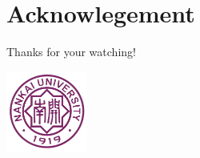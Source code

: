 \documentclass{beamer}
\begin{document}
\section{Acknowlegement}
    \begin{frame} 
        
        
    \end{frame}

    \begin{frame}
        \huge{\centerline{Thanks for your watching!}}
        \vfill
        \centering
            \includegraphics[width=0.2\textwidth]{image.png}
            \label{fig:final}
    \end{frame}

    
\end{document}
